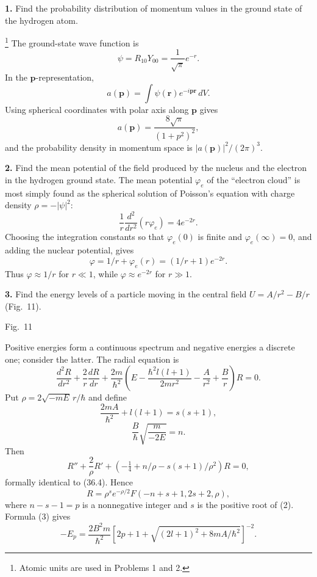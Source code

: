 \ProblemHeading

\textbf{1.} Find the probability distribution of momentum values in the
ground state of the hydrogen atom.

\SolutionHeading\footnote{Atomic units are used in Problems 1 and 2.} The
ground-state wave function is
\[\psi=R_{10}Y_{00}=\frac1{\sqrt\pi}e^{-r}.\]
In the $\mathbf p$-representation,
\[a(\mathbf p)=\int\psi(\mathbf r)e^{-i\mathbf p\mathbf r}\,dV.\]
Using spherical coordinates with polar axis along $\mathbf p$ gives
\[a(\mathbf p)=\frac{8\sqrt\pi}{(1+p^2)^2},\]
and the probability density in momentum space is
$|a(\mathbf p)|^2/(2\pi)^3$.

\textbf{2.} Find the mean potential of the field produced by the nucleus and
the electron in the hydrogen ground state.
\SolutionHeading The mean potential $\varphi_e$ of the ``electron cloud'' is
most simply found as the spherical solution of Poisson's equation with charge
density $\rho=-|\psi|^2$:
\[\frac1r\frac{d^2}{dr^2}(r\varphi_e)=4e^{-2r}.\]
Choosing the integration constants so that $\varphi_e(0)$ is finite and
$\varphi_e(\infty)=0$, and adding the nuclear potential, gives
\[\varphi=1/r+\varphi_e(r)=(1/r+1)e^{-2r}.\]
Thus $\varphi\approx1/r$ for $r\ll1$, while
$\varphi\approx e^{-2r}$ for $r\gg1$.

\newpage
\textbf{3.} Find the energy levels of a particle moving in the central field
$U=A/r^2-B/r$ (Fig.~11).

\begin{center}

\small Fig.~11
\end{center}

\SolutionHeading Positive energies form a continuous spectrum and negative
energies a discrete one; consider the latter. The radial equation is
\begin{equation}
 \frac{d^2R}{dr^2}+\frac2r\frac{dR}{dr}+\frac{2m}{\hbar^2}
 \left(E-\frac{\hbar^2l(l+1)}{2mr^2}-\frac A{r^2}+\frac Br\right)R=0.
 \tag{1}
\end{equation}
Put $\rho=2\sqrt{-mE}\,r/\hbar$ and define
\begin{equation}\frac{2mA}{\hbar^2}+l(l+1)=s(s+1),\tag{2}\end{equation}
\begin{equation}\frac B\hbar\sqrt{\frac m{-2E}}=n.\tag{3}\end{equation}
Then
\[R''+\frac2\rho R'+(-\tfrac14+n/\rho-s(s+1)/\rho^2)R=0,\]
formally identical to (36.4). Hence
\[R=\rho^se^{-\rho/2}F(-n+s+1,2s+2,\rho),\]
where $n-s-1=p$ is a nonnegative integer and $s$ is the positive root of
(2). Formula (3) gives
\[
 -E_p=\frac{2B^2m}{\hbar^2}
 [2p+1+\sqrt{(2l+1)^2+8mA/\hbar^2}]^{-2}.
\]

